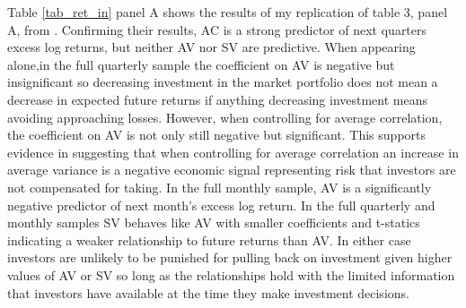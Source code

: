 Table \ref{tab_ret_in} panel A shows the results of my replication of table 3, panel A, from \cite{pollet_average_2010}. Confirming their results, AC is a strong predictor of next quarters excess log returns, but neither AV nor SV are predictive. When appearing alone,in the full quarterly sample the coefficient on AV is negative but insignificant so decreasing investment in the market portfolio does not mean a decrease in expected future returns if anything decreasing investment means avoiding approaching losses. However, when controlling for average correlation, the coefficient on AV is not only still negative but significant. This supports evidence in \citet{pollet_average_2010} suggesting that when controlling for average correlation an increase in average variance is a negative economic signal representing risk that investors are not compensated for taking. In the full monthly sample, AV is a significantly negative predictor of next month's excess log return. In the full quarterly and monthly samples SV behaves like AV with smaller coefficients and t-statics indicating a weaker relationship to future returns than AV. In either case investors are unlikely to be punished for pulling back on investment given higher values of AV or SV so long as the relationships hold with the limited information that investors have available at the time they make investment decisions.